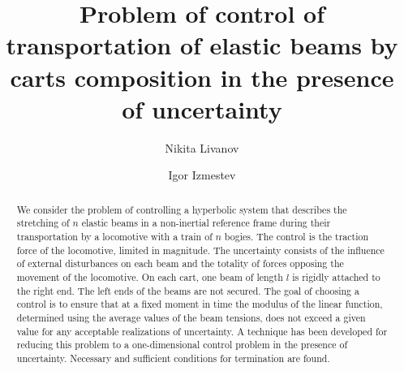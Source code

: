 \begin{englishtitle} %
\title{Problem of control of transportation of elastic beams by carts composition in the presence of uncertainty}
\author{Nikita Livanov \and  Igor Izmestev
}

\maketitle

\begin{abstract}
We consider the problem of controlling a hyperbolic system that describes the stretching of $n$ elastic beams in a non-inertial reference frame during their transportation by a locomotive with a train of $n$ bogies. The control is the traction force of the locomotive, limited in magnitude. The uncertainty consists of the influence of external disturbances on each beam and the totality of forces opposing the movement of the locomotive. On each cart, one beam of length $l$ is rigidly attached to the right end. The left ends of the beams are not secured. The goal of choosing a control is to ensure that at a fixed moment in time the modulus of the linear function, determined using the average values of the beam tensions, does not exceed a given value for any acceptable realizations of uncertainty. A technique has been developed for reducing this problem to a one-dimensional control problem in the presence of uncertainty. Necessary and sufficient conditions for termination are found.

\end{abstract}
\end{englishtitle}

\iffalse
%
%


\documentclass[12pt]{llncs}  

